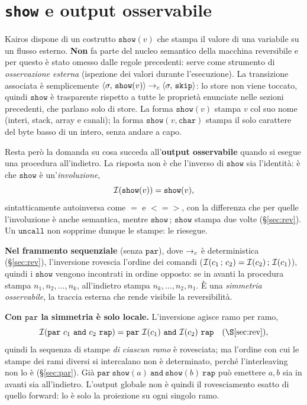 \section{\texttt{show} e output osservabile}
\label{sec:show}

Kairos dispone di un costrutto $\mathtt{show}(v)$ che stampa il valore di una
variabile su un flusso esterno. \textbf{Non} fa parte del nucleo semantico della
macchina reversibile e per questo è stato omesso dalle regole precedenti: serve
come strumento di \emph{osservazione esterna} (ispezione dei valori durante
l'esecuzione). La transizione associata è semplicemente
$\langle \sigma,\, \mathtt{show}(v) \rangle \to_c \langle \sigma,\, \mathtt{skip} \rangle$: lo store non viene toccato,
quindi $\mathtt{show}$ è trasparente rispetto a tutte le proprietà enunciate
nelle sezioni precedenti, che parlano solo di store. La forma $\mathtt{show}(v)$ stampa
$v$ col suo nome (interi, stack, array e canali); la forma
$\mathtt{show}(v,\mathtt{char})$ stampa il solo carattere del byte basso di un
intero, senza andare a capo.

\medskip
\noindent
Resta però la domanda su cosa succeda all'\textbf{output osservabile} quando
si esegue una procedura all'indietro. La risposta non è che l'inverso di
$\mathtt{show}$ sia l'identità: è che $\mathtt{show}$ è un'\emph{involuzione},
\[
\mathcal{I}(\mathtt{show}(v)) = \mathtt{show}(v),
\]
sintatticamente autoinversa come $\mathbin{\hat{}\!=}$ e $\mathbin{<\!=\!>}$, con la differenza che per quelle l'involuzione è anche semantica, mentre $\mathtt{show}\,;\,\mathtt{show}$ stampa due volte
(\S\ref{sec:rev}). Un $\mathtt{uncall}$ non sopprime dunque le stampe: le
riesegue.

\medskip
\noindent
\textbf{Nel frammento sequenziale} (senza $\mathtt{par}$), dove $\to_c$ è
deterministica (\S\ref{sec:rev}), l'inversione rovescia l'ordine dei comandi
($\mathcal{I}(c_1\,;\,c_2) = \mathcal{I}(c_2)\,;\,\mathcal{I}(c_1)$), quindi i $\mathtt{show}$
vengono incontrati in ordine opposto: se in avanti la procedura stampa
$n_1, n_2, \dots, n_k$, all'indietro stampa $n_k, \dots, n_2, n_1$. È una
\emph{simmetria osservabile}, la traccia esterna che rende visibile la
reversibilità.

\medskip
\noindent
\textbf{Con $\mathtt{par}$ la simmetria è solo locale.} L'inversione agisce
ramo per ramo,
\[
\Inv{\mathtt{par}\ c_1\ \mathtt{and}\ c_2\ \mathtt{rap}} =
\mathtt{par}\ \Inv{c_1}\ \mathtt{and}\ \Inv{c_2}\ \mathtt{rap}
\quad (\S\ref{sec:rev}),
\]
quindi la sequenza di stampe \emph{di ciascun ramo} è
rovesciata; ma l'ordine con cui le stampe dei rami diversi si intercalano non
è determinato, perché l'interleaving non lo è (\S\ref{sec:par}). Già
$\mathtt{par}\ \mathtt{show}(a)\ \mathtt{and}\ \mathtt{show}(b)\ \mathtt{rap}$
può emettere $a,b$ sia in avanti sia all'indietro. L'output globale non è
quindi il rovesciamento esatto di quello forward: lo è solo la proiezione su
ogni singolo ramo.

